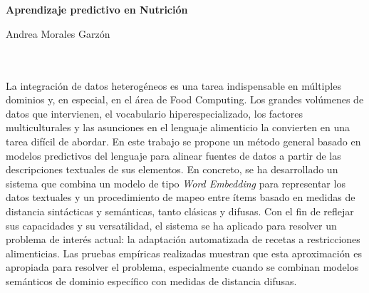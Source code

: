 \chapter*{}






\cleardoublepage
\thispagestyle{empty}

\begin{center}
{\large\bfseries Aprendizaje predictivo en Nutrición}\\
\end{center}
\begin{center}
Andrea Morales Garzón\\
\end{center}

\\

\vspace{0.7cm}
\\

La integración de datos heterogéneos es una tarea indispensable en múltiples dominios y, en especial, en el área de Food Computing. Los grandes volúmenes de datos que intervienen, el vocabulario hiperespecializado, los factores multiculturales y las asunciones en el lenguaje alimenticio la convierten en una tarea difícil de abordar. En este trabajo se propone un método general basado en modelos predictivos del lenguaje para alinear fuentes de datos a partir de las descripciones textuales de sus elementos. En concreto, se ha desarrollado un sistema que combina un modelo de tipo \textit{Word Embedding} para representar los datos textuales y un procedimiento de mapeo entre ítems basado en medidas de distancia sintácticas y semánticas, tanto clásicas y difusas.
Con el fin de reflejar sus capacidades y su versatilidad, el sistema se ha aplicado para resolver un problema de interés actual: la adaptación automatizada de recetas a restricciones alimenticias. Las pruebas empíricas realizadas muestran que esta aproximación es apropiada para resolver el problema, especialmente cuando se combinan modelos semánticos de dominio específico con medidas de distancia difusas.




